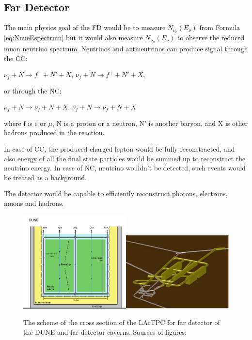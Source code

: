 \subsection{Far Detector}

The main physics goal of the FD would be to measure $N_{\nu_e}(E_{\nu})$  from Formula \ref{eq:NnueEspectrum} but it would also measure $N_{\nu_\mu}(E_{\nu})$ to observe the reduced muon neutrino spectrum. Neutrinos and antineutrinos can produce signal through the CC:

$\nu_f+N \rightarrow f^- + N' +X$, $\bar{\nu_f}+N \rightarrow f^+ + N' +X$,

or through the NC:

$\nu_f+N \rightarrow \nu_f + N +X$, $\bar{\nu_f}+N \rightarrow \bar{\nu_f} + N +X$

where f is e or $\mu$, N is a proton or a neutron, N' is another baryon, and X is other hadrons produced in the reaction.

In case of CC, the produced charged lepton would be fully reconstracted, and also energy of all the final state particles would be summed up to reconstract the neutrino energy. In case of NC, neutrino wouldn't be detected, such events would be treated as a background.



The detector would be capable to efficiently reconstruct photons, electrons, muons and hadrons. \\

\begin{figure}
\caption{The scheme of the cross section of the LArTPC for far detector of the DUNE and far detector caverns. Sources of figures: \cite{ref_LBNFdoc_volume-detectors}}
\label{fig:farDetector_TPC}
\centering
\includegraphics[width=0.5\textwidth, keepaspectratio=true]{figs/farDetector_TPC.png}\includegraphics[width=0.5\textwidth, keepaspectratio=true]{figs/farDetector_Caverns.png}
\end{figure}

